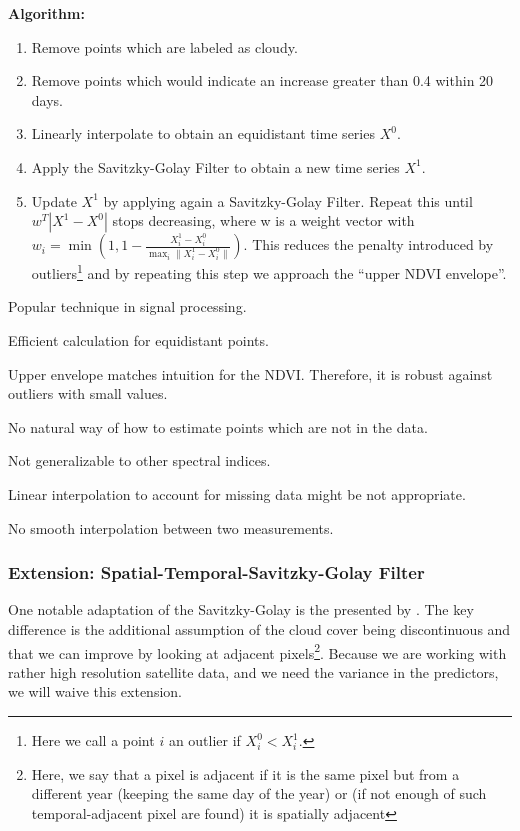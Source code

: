 \textbf{Algorithm:}
\begin{enumerate}
	\item Remove points which are labeled as cloudy.
	\item Remove points which would indicate an increase greater than 0.4 within 20 days.
	\item Linearly interpolate to obtain an equidistant time series $X^0$.
	\item Apply the Savitzky-Golay Filter to obtain a new time series $X^1$.
	\item Update $X^1$ by applying again a Savitzky-Golay Filter. Repeat this until $w^T |X^1-X^0|$ stops decreasing, where w is a weight vector with $w_i = \min\left(1, 1 - \frac{X^1_i-X^0_i}{\max_i\|X^1_i-X^0_i\|}\right)$. This reduces the penalty introduced by outliers\footnote{Here we call a point $i$ an outlier if $X^0_i<X^1_i$.} and by repeating this step we approach the ``upper NDVI envelope''.
\end{enumerate}

\begin{my_pros_cons_table}{
		\item Popular technique in signal processing.
		\item Efficient calculation for equidistant points.
		\item Upper envelope matches intuition for the NDVI. Therefore, it is robust against outliers with small values.
	}{
		\item No natural way of how to estimate points which are not in the data.
		\item Not generalizable to other spectral indices.
		\item Linear interpolation to account for missing data might be not appropriate.
		\item No smooth interpolation between two measurements.
	}
\end{my_pros_cons_table}


\subsubsection*{Extension: Spatial-Temporal-Savitzky-Golay Filter}
One notable adaptation of the Savitzky-Golay is the presented by \cite{caoSimpleMethodImprove2018b}. The key difference is the additional assumption of the cloud cover being discontinuous and that we can improve by looking at adjacent pixels\footnote{Here, we say that a pixel is adjacent if it is the same pixel but from a different year (keeping the same day of the year) or (if not enough of such temporal-adjacent pixel are found) it is spatially adjacent}. Because we are working with rather high resolution satellite data, and we need the variance in the predictors, we will waive this extension.


